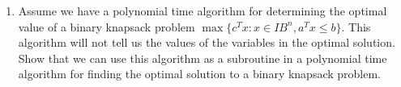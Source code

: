 \documentclass[12pt]{article}
\newcommand{\binary}{I\!\! B}
\begin{document}
\begin{enumerate}
\item Assume we have a polynomial time algorithm for determining the optimal
value of a binary knapsack problem $\max\{c^Tx: x \in \binary^n, a^Tx \leq b\}$.
This algorithm will not tell us the values of the variables in the optimal solution.
Show that we can use this algorithm as a subroutine in a polynomial time
algorithm for finding the optimal solution to a binary knapsack problem.

\end{enumerate}
\end{document}

